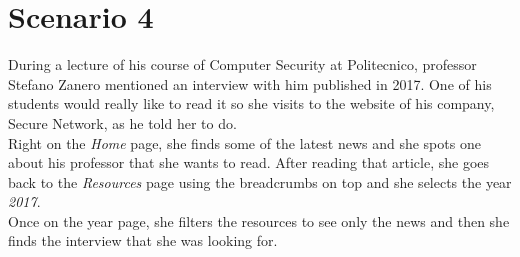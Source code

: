 \documentclass[12pt]{report}
\begin{document}
\clearpage
\section{Scenario 4}
During a lecture of his course of Computer Security at Politecnico, professor Stefano Zanero mentioned an interview with him published in 2017.
One of his students would really like to read it so she visits to the website of his company, Secure Network, as he told her to do.
\\
\noindent
Right on the \emph{Home} page, she finds some of the latest news and she spots one about his professor that she wants to read.
After reading that article, she goes back to the \emph{Resources} page using the breadcrumbs on top and she selects the year \emph{2017}.
\\
\noindent
Once on the year page, she filters the resources to see only the news and then she finds the interview that she was looking for.
\end{document}
